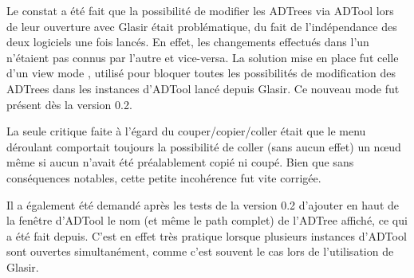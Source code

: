 Le constat a été fait que la possibilité de modifier les ADTrees via ADTool lors de leur ouverture avec Glasir était problématique, du fait de l'indépendance des deux logiciels une fois lancés. En effet, les changements effectués dans l'un n'étaient pas connus par l'autre et vice-versa. La solution mise en place fut celle d'un \og view mode \fg{}, utilisé pour bloquer toutes les possibilités de modification des ADTrees dans les instances d'ADTool lancé depuis Glasir. Ce nouveau mode fut présent dès la version 0.2.

La seule critique faite à l'égard du couper/copier/coller était que le menu déroulant comportait toujours la possibilité de coller (sans aucun effet) un n\oe{}ud même si aucun n'avait été préalablement copié ni coupé. Bien que sans conséquences notables, cette petite incohérence fut vite corrigée. 

Il a également été demandé après les tests de la version 0.2 d'ajouter en haut de la fenêtre d'ADTool le nom (et même le path complet) de l'ADTree affiché, ce qui a été fait depuis. C'est en effet très pratique lorsque plusieurs instances d'ADTool sont ouvertes simultanément, comme c'est souvent le cas lors de l'utilisation de Glasir. 






